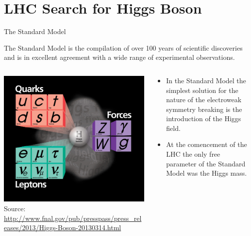 \section{LHC Search for Higgs Boson}


\begin{frame}{The Standard Model}
\begin{center}
The Standard Model is the compilation of over 100 years of scientific discoveries and is in excellent agreement with a wide range of experimental observations.
\\
\vspace{1em}
\begin{columns}
  \begin{column}{0.5\textwidth}
    \begin{center}
    \includegraphics[width=.95\textwidth]{images/standard_model_particles.jpg}\vspace{.1em}
    {\fontsize{.1cm}{.001em}\selectfont Source: \url{http://www.fnal.gov/pub/presspass/press_releases/2013/Higgs-Boson-20130314.html}}
    \end{center}
  \end{column}
  \begin{column}{0.5\textwidth}
\begin{center}
\begin{itemize}
  \item
In the Standard Model the simplest solution for the nature of the electroweak symmetry breaking is the introduction of the Higgs field.
\item 
At the comencement of the LHC the only free parameter of the Standard Model was the Higgs mass.
\end{itemize}
\end{center}
  \end{column}
\end{columns}
\end{center}
\end{frame}

